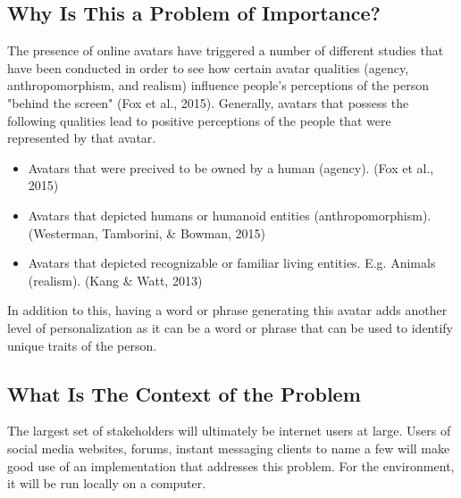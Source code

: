 \documentclass{article}
\begin{document}
\subsection{Why Is This a Problem of Importance?}
The presence of online avatars have triggered a number of different studies that have been conducted in order to see how certain avatar qualities (agency, anthropomorphism, and realism) influence people's perceptions of the person "behind the screen" (Fox et al., 2015). Generally, avatars that possess the following qualities lead to positive perceptions of the people that were represented by that avatar.
\begin{itemize}
\item{Avatars that were precived to be owned by a human (agency). (Fox et al., 2015)}
\item{Avatars that depicted humans or humanoid entities (anthropomorphism). (Westerman, Tamborini, & Bowman, 2015)}
\item{Avatars that depicted recognizable or familiar living entities. E.g. Animals (realism). (Kang & Watt, 2013)}
\end{itemize}
In addition to this, having a word or phrase generating this avatar adds another level of personalization as it can be a word or phrase that can be used to identify unique traits of the person.
\subsection{What Is The Context of the Problem}
The largest set of stakeholders will ultimately be internet users at large. Users of social media websites, forums, instant messaging clients to name a few will make good use of an implementation that addresses this problem. For the environment, it will be run locally on a computer.





\end{document}
